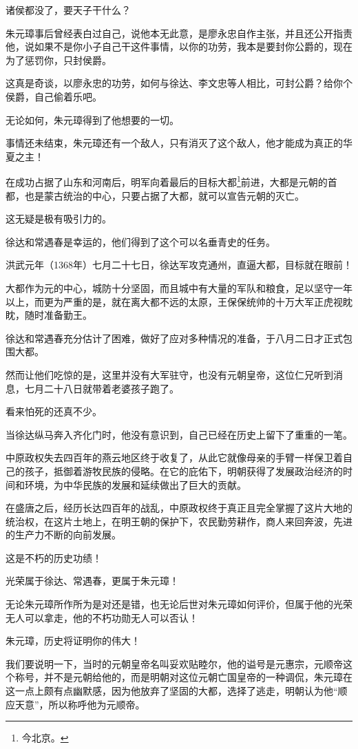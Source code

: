 \begin{multicols}{\theparacolNo}
		诸侯都没了，要天子干什么？

		朱元璋事后曾经表白过自己，说他本无此意，是廖永忠自作主张，并且还公开指责他，说如果不是你小子自己干这件事情，以你的功劳，我本是要封你公爵的，现在为了惩罚你，只封侯爵。

		这真是奇谈，以廖永忠的功劳，如何与徐达、李文忠等人相比，可封公爵？给你个侯爵，自己偷着乐吧。

		无论如何，朱元璋得到了他想要的一切。

		事情还未结束，朱元璋还有一个敌人，只有消灭了这个敌人，他才能成为真正的华夏之主！

		在成功占据了山东和河南后，明军向着最后的目标大都\footnote{今北京。}前进，大都是元朝的首都，也是蒙古统治的中心，只要占据了大都，就可以宣告元朝的灭亡。

		这无疑是极有吸引力的。

		徐达和常遇春是幸运的，他们得到了这个可以名垂青史的任务。

		洪武元年（1368年）七月二十七日，徐达军攻克通州，直逼大都，目标就在眼前！

		大都作为元的中心，城防十分坚固，而且城中有大量的军队和粮食，足以坚守一年以上，而更为严重的是，就在离大都不远的太原，王保保统帅的十万大军正虎视眈眈，随时准备勤王。

		徐达和常遇春充分估计了困难，做好了应对多种情况的准备，于八月二日才正式包围大都。

		然而让他们吃惊的是，这里并没有大军驻守，也没有元朝皇帝，这位仁兄听到消息，七月二十八日就带着老婆孩子跑了。

		看来怕死的还真不少。

		当徐达纵马奔入齐化门时，他没有意识到，自己已经在历史上留下了重重的一笔。

		中原政权失去四百年的燕云地区终于收复了，从此它就像母亲的手臂一样保卫着自己的孩子，抵御着游牧民族的侵略。在它的庇佑下，明朝获得了发展政治经济的时间和环境，为中华民族的发展和延续做出了巨大的贡献。

		在盛唐之后，经历长达四百年的战乱，中原政权终于真正且完全掌握了这片大地的统治权，在这片土地上，在明王朝的保护下，农民勤劳耕作，商人来回奔波，先进的生产力不断的向前发展。

		这是不朽的历史功绩！

		光荣属于徐达、常遇春，更属于朱元璋！

		无论朱元璋所作所为是对还是错，也无论后世对朱元璋如何评价，但属于他的光荣无人可以拿走，他的不朽功勋无人可以否认！

		朱元璋，历史将证明你的伟大！

		我们要说明一下，当时的元朝皇帝名叫妥欢贴睦尔，他的谥号是元惠宗，元顺帝这个称号，并不是元朝给他的，而是明朝对这位元朝亡国皇帝的一种调侃，朱元璋在这一点上颇有点幽默感，因为他放弃了坚固的大都，选择了逃走，明朝认为他“顺应天意”，所以称呼他为元顺帝。


\end{multicols}
